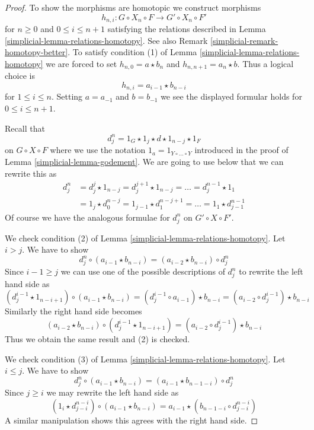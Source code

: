 \begin{proof}

To show the morphisms are homotopic we construct morphisms
$$
h_{n, i} : G \circ X_n \circ F \to G' \circ X_n \circ F'
$$
for $n \geq 0$ and $0 \leq i \leq n + 1$
satisfying the relations described in Lemma \ref{simplicial-lemma-relations-homotopy}.
See also Remark \ref{simplicial-remark-homotopy-better}. To satisfy condition (1)
of Lemma \ref{simplicial-lemma-relations-homotopy} we are forced to set
$h_{n, 0} = a \star b_n$ and $h_{n , n + 1} = a_n \star b$.
Thus a logical choice is
$$
h_{n , i} = a_{i - 1} \star b_{n - i}
$$
for $1 \leq i \leq n$. Setting $a = a_{-1}$ and $b = b_{-1}$ we
see the displayed formular holds for $0 \leq i \leq n + 1$.

\medskip\noindent
Recall that
$$
d^n_j = 1_G \star 1_j \star d \star 1_{n - j} \star 1_F
$$
on $G \circ X \circ F$ where we use
the notation $1_a = 1_{Y \circ \ldots \circ Y}$ introduced
in the proof of Lemma \ref{simplicial-lemma-godement}. We are going to use below
that we can rewrite this as
\begin{align*}
d^n_j
& =
d^j_j \star 1_{n - j} =
d^{j + 1}_j \star 1_{n - j} = \ldots = d^{n - 1}_j \star 1_1 \\
& =
1_j \star d^{n - j}_0 = 1_{j - 1} \star d^{n - j + 1}_1 = \ldots =
1_1 \star d^{n - 1}_{j - 1}
\end{align*}
Of course we have the analogous formulae for $d^n_j$ on $G' \circ X \circ F'$.

\medskip\noindent
We check condition (2) of Lemma \ref{simplicial-lemma-relations-homotopy}.
Let $i > j$. We have to show
$$
d^n_j \circ (a_{i - 1} \star b_{n - i}) =
(a_{i - 2} \star b_{n - i}) \circ d^n_j
$$
Since $i - 1 \geq j$ we can use one of the possible descriptions of
$d^n_j$ to rewrite the left hand side as
$$
(d^{i - 1}_j \star 1_{n - i + 1}) \circ (a_{i - 1} \star b_{n - i}) =
(d^{i - 1}_j \circ a_{i - 1}) \star b_{n - i} =
(a_{i - 2} \circ d^{i - 1}_j) \star b_{n - i}
$$
Similarly the right hand side becomes
$$
(a_{i - 2} \star b_{n - i}) \circ (d^{i - 1}_j \star 1_{n - i + 1}) =
(a_{i - 2} \circ d^{i - 1}_j) \star b_{n - i}
$$
Thus we obtain the same result and (2) is checked.

\medskip\noindent
We check condition (3) of Lemma \ref{simplicial-lemma-relations-homotopy}.
Let $i \leq j$. We have to show
$$
d^n_j \circ (a_{i - 1} \star b_{n - i}) =
(a_{i - 1} \star b_{n - 1 - i}) \circ d^n_j
$$
Since $j \geq i$ we may rewrite the left hand side as
$$
(1_i \star d^{n - i}_{j - i}) \circ (a_{i - 1} \star b_{n - i}) =
a_{i - 1} \star (b_{n - 1 - i} \circ d^{n - i}_{j - i})
$$
A similar manipulation shows this agrees with the right hand side.


\end{proof}
